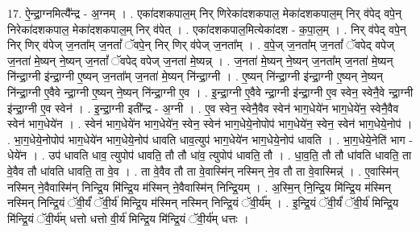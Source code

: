 \documentclass[17pt]{extarticle}
\begin{document}
17. ऐ॒न्द्रा॒ग्नमित्यै᳚न्द्र - अ॒ग्नम् । . एका॑दशकपाल॒म् निर् णिरेका॑दशकपाल॒ मेका॑दशकपाल॒म् निर् व॑पेद् वपे॒न् निरेका॑दशकपाल॒ मेका॑दशकपाल॒म् निर् व॑पेत् । . एका॑दशकपाल॒मित्येका॑दश - क॒पा॒ल॒म् । . निर् व॑पेद् वपे॒न् निर् णिर् व॑पेज् ज॒नता᳚म् ज॒नतां᳚ ॅवपे॒न् निर् णिर् व॑पेज् ज॒नता᳚म् । . व॒पे॒ज् ज॒नता᳚म् ज॒नतां᳚ ॅवपेद् वपेज् ज॒नता॑ मे॒ष्यन् ने॒ष्यन् ज॒नतां᳚ ॅवपेद् वपेज् ज॒नता॑ मे॒ष्यन्न् । . ज॒नता॑ मे॒ष्यन् ने॒ष्यन् ज॒नता᳚म् ज॒नता॑ मे॒ष्यन् नि॑न्द्रा॒ग्नी इ॑न्द्रा॒ग्नी ए॒ष्यन् ज॒नता᳚म् ज॒नता॑ मे॒ष्यन् नि॑न्द्रा॒ग्नी । . ए॒ष्यन् नि॑न्द्रा॒ग्नी इ॑न्द्रा॒ग्नी ए॒ष्यन् ने॒ष्यन् नि॑न्द्रा॒ग्नी ए॒वैवे न्द्रा॒ग्नी ए॒ष्यन् ने॒ष्यन् नि॑न्द्रा॒ग्नी ए॒व । . इ॒न्द्रा॒ग्नी ए॒वैवे न्द्रा॒ग्नी इ॑न्द्रा॒ग्नी ए॒व स्वेन॒ स्वेनै॒वे न्द्रा॒ग्नी इ॑न्द्रा॒ग्नी ए॒व स्वेन॑ । . इ॒न्द्रा॒ग्नी इती᳚न्द्र - अ॒ग्नी । . ए॒व स्वेन॒ स्वेनै॒वैव स्वेन॑ भाग॒धेये॑न भाग॒धेये॑न॒ स्वेनै॒वैव स्वेन॑ भाग॒धेये॑न । . स्वेन॑ भाग॒धेये॑न भाग॒धेये॑न॒ स्वेन॒ स्वेन॑ भाग॒धेये॒नोपोप॑ भाग॒धेये॑न॒ स्वेन॒ स्वेन॑ भाग॒धेये॒नोप॑ । . भा॒ग॒धेये॒नोपोप॑ भाग॒धेये॑न भाग॒धेये॒नोप॑ धावति धाव॒त्युप॑ भाग॒धेये॑न भाग॒धेये॒नोप॑ धावति । . भा॒ग॒धेये॒नेति॑ भाग - धेये॑न । . उप॑ धावति धाव॒ त्युपोप॑ धावति॒ तौ तौ धा॑व॒ त्युपोप॑ धावति॒ तौ । . धा॒व॒ति॒ तौ तौ धा॑वति धावति॒ ता वे॒वैव तौ धा॑वति धावति॒ ता वे॒व । . ता वे॒वैव तौ ता वे॒वास्मि॑न् नस्मिन् ने॒व तौ ता वे॒वास्मिन्न्॑ । . ए॒वास्मि॑न् नस्मिन् ने॒वैवास्मि॑न् निन्द्रि॒य मि॑न्द्रि॒य म॑स्मिन् ने॒वैवास्मि॑न् निन्द्रि॒यम् । . अ॒स्मि॒न् नि॒न्द्रि॒य मि॑न्द्रि॒य म॑स्मिन् नस्मिन् निन्द्रि॒यं ॅवी॒र्यं॑ ॅवी॒र्य॑ मिन्द्रि॒य म॑स्मिन् नस्मिन् निन्द्रि॒यं ॅवी॒र्य᳚म् । . इ॒न्द्रि॒यं ॅवी॒र्यं॑ ॅवी॒र्य॑ मिन्द्रि॒य मि॑न्द्रि॒यं ॅवी॒र्य॑म् धत्तो धत्तो वी॒र्य॑ मिन्द्रि॒य मि॑न्द्रि॒यं ॅवी॒र्य॑म् धत्तः । \newline
\end{document}
